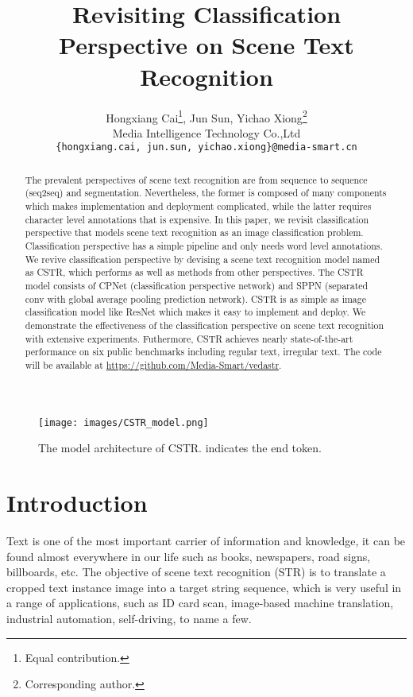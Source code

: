 \documentclass[final]{cvpr}
\begin{document}
\title{Revisiting Classification Perspective on Scene Text Recognition}

\author{
 Hongxiang Cai\thanks{Equal contribution.}, Jun Sun\footnotemark[1] , Yichao Xiong\thanks{Corresponding author.} \\
  Media Intelligence Technology Co.,Ltd\\
  \texttt{\small \{hongxiang.cai, jun.sun, yichao.xiong\}@media-smart.cn} 
}

\maketitle

\begin{figure*}[ht]
\centering
  \texttt{[image: images/CSTR\_model.png]}
\centering
\caption{The model architecture of CSTR.  indicates the end token.}
\label{fig.CSTR_model}
\end{figure*}

\begin{abstract}
The prevalent perspectives of scene text recognition are from sequence to sequence (seq2seq) and segmentation. Nevertheless, the former is composed of many components which makes implementation and deployment complicated, while the latter requires character level annotations that is expensive.
In this paper, we revisit classification perspective that models scene text recognition as an image classification problem. Classification perspective has a simple pipeline and only needs word level annotations. We revive classification perspective by devising a scene text recognition model named as CSTR, which performs as well as methods from other perspectives.
The CSTR model consists of CPNet (classification perspective network) and SPPN (separated conv with global average pooling prediction network). 
CSTR is as simple as image classification model like ResNet \cite{he2016deep} which makes it easy to implement and deploy.
We demonstrate the effectiveness of the classification perspective on scene text recognition with extensive experiments. Futhermore, CSTR achieves nearly state-of-the-art performance on six public benchmarks including regular text, irregular text. The code will be available at \url{https://github.com/Media-Smart/vedastr}.
\end{abstract}

\section{Introduction}
Text is one of the most important carrier of information and knowledge, it can be found almost everywhere in our life such as books, newspapers, road signs, billboards, etc. The objective of scene text recognition (STR) is to translate a cropped text instance image into a target string sequence, which is very useful in a range of applications, such as ID card scan, image-based machine translation, industrial automation, self-driving, to name a few. 
\end{document}

